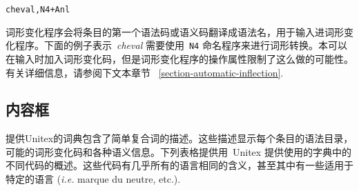 \begin{verbatim}
cheval,N4+Anl
\end{verbatim}

\noindent 
词形变化程序会将条目的第一个语法码或语义码翻译成语法名，用于输入进词形变化程序。下面的例子表示\ \textit{cheval} 需要使用\ \verb+N4+ 命名程序来进行词形转换。本可以在输入时加入词形变化码，但是词形变化程序的操作属性限制了这么做的可能性。有关详细信息，请参阅下文本章节 ~\ref{section-automatic-inflection}.


\subsection{内容框}

提供Unitex的词典包含了简单复合词的描述。这些描述显示每个条目的语法目录，可能的词形变化码和各种语义信息。下列表格提供用\ Unitex 提供使用的字典中的不同代码的概述。这些代码有几乎所有的语言相同的含义，甚至其中有一些适用于特定的语言 (\textit{i.e.} marque du neutre, etc.).


